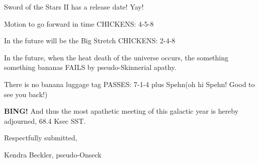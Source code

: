 \documentclass[10pt]{article}
\newcommand{\bing}{{\bf BING!} }
\newcommand{\ps}{ plus Spehn\xspace}
\newcommand{\onseck}{Kendra Beckler, pseudo-Onseck}
\begin{document}
Sword of the Stars II has a release date!  Yay!

Motion to go forward in time CHICKENS: 4-5-8

In the future will be the Big Stretch CHICKENS: 2-4-8

In the future, when the heat death of the universe occurs, the something something bananas FAILS by pseudo-Skinnerial apathy.

There is no banana luggage tag PASSES: 7-1-4 \ps (oh hi Spehn!  Good to see you back!)

\bing
\noindent
And thus the most apathetic meeting of this galactic year is hereby adjourned, 68.4 Ksec SST.

\vspace{18pt}

\centerline{Respectfully submitted,}
\centerline{\onseck}
\end{document}
